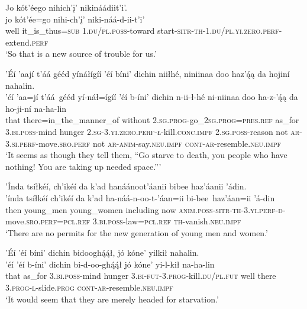 \ea\label{ex:text7-16-8}
Jo kót’éego nihich’į’ nikináádiit’i’.\\
\gll jo	kót’ée=go	nihi-ch’į’	niki-náá-d-ii-t’i’\\
     well	it\_is\_thus=\textsc{sub}	1.\textsc{du}/\textsc{pl}.\textsc{poss}-toward	start-\textsc{sitr}-\textsc{th}-1.\textsc{du}/\textsc{pl}.\textsc{yi}.\textsc{zero}.\textsc{perf}-extend.\textsc{perf}\\
\glt `So that is a new source of trouble for us.'
\z

\ea\label{ex:text7-16-9}
’Éí ’aají t’áá gééd yínáłígíí ’éí bíni’ dichin niiłhé, niniinaa doo haz’ą́ą da hojiní nahalin.\\
\gll ’éí	’aa=jí	t’áá~{gééd}	yí-náł=ígíí	’éí	b-íni’	dichin	n-ii-ł-hé	ni-niinaa	doo	ha-z-’ą́ą	da	ho-ji-ní	na-ha-lin\\
     that	there=in\_the\_manner\_of	without	2.\textsc{sg}.\textsc{prog}-go\_2\textsc{sg}.\textsc{prog}=\textsc{pres}.\textsc{ref}	as\_for	3.\textsc{bi}.\textsc{poss}-mind	hunger	2.\textsc{sg}-3.\textsc{yi}.\textsc{zero}.\textsc{perf}-\textsc{ł}-kill.\textsc{conc}.\textsc{impf}	2.\textsc{sg}.\textsc{poss}-reason	not	\textsc{ar}-3.\textsc{si}.\textsc{perf}-move.\textsc{sro}.\textsc{perf}	not	\textsc{ar}-\textsc{anim}-say.\textsc{neu}.\textsc{impf}	\textsc{cont}-\textsc{ar}-resemble.\textsc{neu}.\textsc{impf}\\
\glt `It seems as though they tell them, ``Go starve to death, you people who have nothing! You are taking up needed space.'''
\z

\ea\label{ex:text7-16-10}
’Índa tsíłkéí, ch’ikéí da k’ad hanáánoot’áanii bibee haz’áanii ’ádin.\\
\gll ’índa	tsíłkéí	ch’ikéí	da	k’ad	ha-náá-n-oo-t-’áan=ii	bi-bee~{haz’áan=ii}	’á-din\\
     then	young\_men	young\_women	including	now	\textsc{anim}.\textsc{poss}-\textsc{sitr}-\textsc{th}-3.\textsc{yi}.\textsc{perf}-\textsc{d}-move.\textsc{sro}.\textsc{perf}=\textsc{pcl}.\textsc{ref}	3.\textsc{bi}.\textsc{poss}-law=\textsc{pcl}.\textsc{ref}	\textsc{th}-vanish.\textsc{neu}.\textsc{impf}\\
\glt `There are no permits for the new generation of young men and women.'
\z

\ea\label{ex:text7-16-11}
’Éí ’éí bíni’ dichin bidooghą́ą́ł, jó kóne’ yilkił nahalin.\\
\gll ’éí	’éí	b-íni’	dichin	bi-d-oo-ghą́ą́ł	jó	kóne’	yi-l-kił	na-ha-lin\\
     that	as\_for	3.\textsc{bi}.\textsc{poss}-mind	hunger	3.\textsc{bi}-\textsc{fut}-3.\textsc{prog}-kill.\textsc{du}/\textsc{pl}.\textsc{fut}	well	there	3.\textsc{prog}-\textsc{l}-slide.\textsc{prog}	\textsc{cont}-\textsc{ar}-resemble.\textsc{neu}.\textsc{impf}\\
\glt `It would seem that they are merely headed for starvation.'
\z

